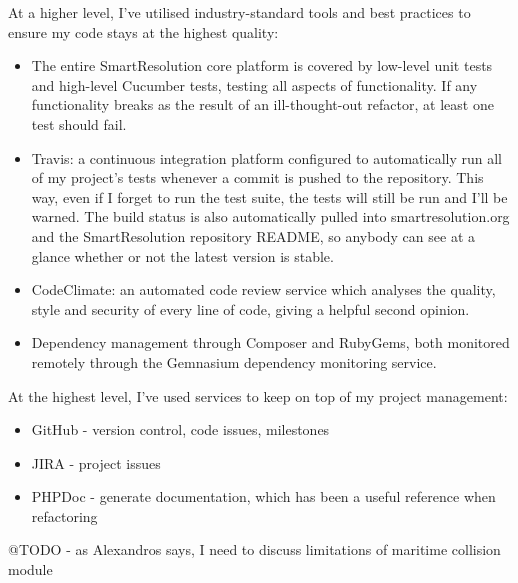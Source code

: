 At a higher level, I've utilised industry-standard tools and best practices to ensure my code stays at the highest quality:

\begin{itemize}
\item The entire SmartResolution core platform is covered by low-level unit tests and high-level Cucumber tests, testing all aspects of functionality. If any functionality breaks as the result of an ill-thought-out refactor, at least one test should fail.
\item Travis: a continuous integration platform configured to automatically run all of my project's tests whenever a commit is pushed to the repository. This way, even if I forget to run the test suite, the tests will still be run and I'll be warned. The build status is also automatically pulled into smartresolution.org and the SmartResolution repository README, so anybody can see at a glance whether or not the latest version is stable.
\item CodeClimate: an automated code review service which analyses the quality, style and security of every line of code, giving a helpful second opinion.
\item Dependency management through Composer and RubyGems, both monitored remotely through the Gemnasium dependency monitoring service.
\end{itemize}

At the highest level, I've used services to keep on top of my project management:

\begin{itemize}
\item GitHub - version control, code issues, milestones
\item JIRA - project issues
\item PHPDoc - generate documentation, which has been a useful reference when refactoring
\end{itemize}

@TODO - as Alexandros says, I need to discuss limitations of maritime collision module
